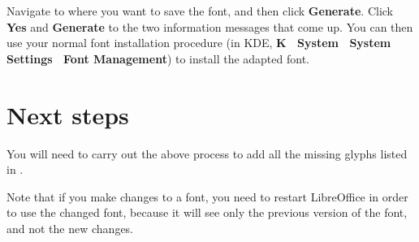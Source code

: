 Navigate to where you want to save the font, and then click \textbf{Generate}.  Click \textbf{Yes} and \textbf{Generate} to the two information messages that come up.  You can then use your normal font installation procedure (in KDE, \textbf{K \textrightarrow\ System \textrightarrow\ System Settings \textrightarrow\ Font Management}) to install the adapted font.

\section{Next steps}

You will need to carry out the above process to add all the missing glyphs listed in .

Note that if you make changes to a font, you need to restart LibreOffice in order to use the changed font, because it will see only the previous version of the font, and not the new changes.
